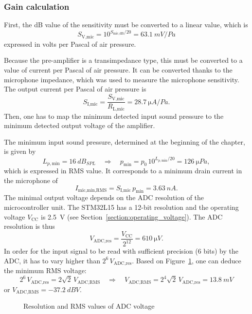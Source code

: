 \documentclass{EPL-master-thesis-covers-EN}
\newcommand{\te}[1]{\textrm{#1}}
\begin{document}
\subsubsection*{Gain calculation}

First, the dB value of the sensitivity must be converted to a linear value, which is
\[
 S_{\te{V,mic}} = 10^{S_{\te{mic,dB}}/20} = \SI{63.1}{mV/Pa}
\]
expressed in volts per Pascal of air pressure.

Because the pre-amplifier is a transimpedance type, this must be converted to a value of current per Pascal of air pressure. It can be converted thanks to the microphone impedance, which was used to measure the microphone sensitivity. The output current per Pascal of air pressure is
\[
 S_{\te{I,mic}} = \frac{S_{\te{V,mic}}}{R_{\te{L,mic}}} = \SI{28.7}{\micro A/Pa}.
\]
Then, one has to map the minimum detected input sound pressure to the minimum detected output voltage of the amplifier.

The minimum input sound pressure, determined at the beginning of the chapter, is given by
\[
 L_{p,\te{min}} = \SI{16}{dB_{SPL}} \quad \Rightarrow \quad p_\te{min} = p_0 \, 10^{L_{p,\te{min}}/20} = \SI{126}{\micro Pa},
\]
which is expressed in RMS value. It corresponds to a minimum drain current in the microphone of 
\[
 I_{\te{mic,min,RMS}} = S_{\te{I,mic}} \, p_\te{min} = \SI{3.63}{nA}.
\]
The minimal output voltage depends on the ADC resolution of the microcontroller unit. The STM32L15 has a 12-bit resolution and the operating voltage $V_\te{CC}$ is \SI{2.5}{V} (see Section~\ref{section:operating_voltage}). The ADC resolution is thus
\[
 V_{\te{ADC,res}} = \frac{V_\te{CC}}{2^{12}} = \SI{610}{\micro V}.
\]
In order for the input signal to be read with sufficient precision (6 bits) by the ADC, it has to vary higher than $2^6 \,V_{\te{ADC,res}}$. Based on Figure~\ref{fig:ADC_res}, one can deduce the minimum RMS voltage:
\[
 2^6 \, V_{\te{ADC,res}} = 2 \sqrt{2} \, V_\te{ADC,RMS} \quad \Rightarrow \quad V_\te{ADC,RMS} = 2^4 \sqrt{2} \, V_{\te{ADC,res}} = \SI{13.8}{mV}
\]
or $V_{\te{ADC,RMS}} = \SI{-37.2}{dBV}$.

\begin{figure}[H]
\centering
{}
\caption{Resolution and RMS values of ADC voltage}
\label{fig:ADC_res}
\end{figure}
\end{document}
